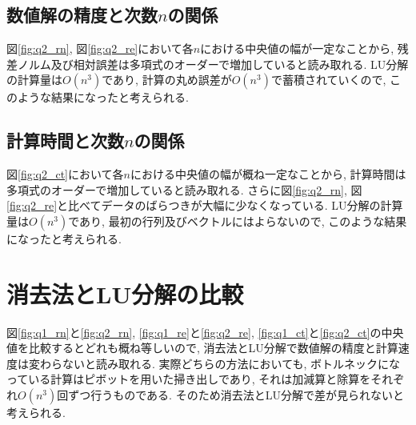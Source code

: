 \documentclass[uplatex,a4j]{jsarticle}
\begin{document}
\newpage
\subsection{数値解の精度と次数$n$の関係}
\label{sec:q2_2}
図\ref{fig:q2_rn}, 図\ref{fig:q2_re}において各$n$における中央値の幅が一定なことから, 
残差ノルム及び相対誤差は多項式のオーダーで増加していると読み取れる. 
LU分解の計算量は$O(n^3)$であり, 計算の丸め誤差が$O(n^3)$で蓄積されていくので, このような結果になったと考えられる.

\subsection{計算時間と次数$n$の関係}
\label{sec:q2_3}
図\ref{fig:q2_ct}において各$n$における中央値の幅が概ね一定なことから, 
計算時間は多項式のオーダーで増加していると読み取れる. 
さらに図\ref{fig:q2_rn}, 図\ref{fig:q2_re}と比べてデータのばらつきが大幅に少なくなっている.
LU分解の計算量は$O(n^3)$であり, 最初の行列及びベクトルにはよらないので, このような結果になったと考えられる.


\section{消去法とLU分解の比較}
図\ref{fig:q1_rn}と\ref{fig:q2_rn}, \ref{fig:q1_re}と\ref{fig:q2_re}, 
\ref{fig:q1_ct}と\ref{fig:q2_ct}の中央値を比較するとどれも概ね等しいので, 
消去法とLU分解で数値解の精度と計算速度は変わらないと読み取れる. 
実際どちらの方法においても, ボトルネックになっている計算はピボットを用いた掃き出しであり, 
それは加減算と除算をそれぞれ$O(n^3)$回ずつ行うものである. 
そのため消去法とLU分解で差が見られないと考えられる. 
\end{document}
